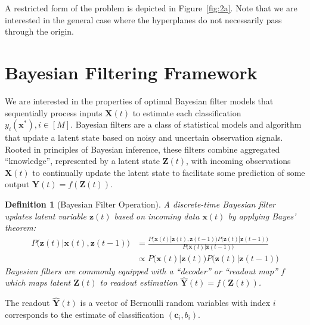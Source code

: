 \documentclass[12pt]{article}
\newtheorem{definition}{Definition}
\begin{document}
A restricted form of the problem is depicted in Figure~\ref{fig:2a}. Note that we are interested in the general case where the hyperplanes do not necessarily pass through the origin. 




\section{Bayesian Filtering Framework}
\label{sec:bayes_framework}

We are interested in the properties of optimal Bayesian filter models that sequentially process inputs $\mathbf X(t)$ to estimate each classification $y_i(\mathbf x^*), i\in [M]$. 
Bayesian filters are a class of statistical models and algorithm that update a latent state based on noisy and uncertain observation signals. 
Rooted in principles of Bayesian inference, these filters combine aggregated ``knowledge'', represented by a latent state $\mathbf Z(t)$, with incoming observations $\mathbf X(t)$ to continually update the latent state to facilitate some prediction of some output $\mathbf Y(t) = f(\mathbf Z(t))$. 


\begin{definition}[Bayesian Filter Operation]
	\label{def:bayesian_filter}
	A discrete-time Bayesian filter updates latent variable $\mathbf z(t)$
	based on incoming data $\mathbf x(t)$ by applying Bayes' theorem: 
	\begin{align}
		\label{eqn:bayes_filter}
		P \big(\mathbf z(t) | \mathbf  x(t), \mathbf z(t-1)\big) &= \frac{
			P\big(\mathbf x(t) | \mathbf z(t), \mathbf z(t-1)\big) 
			P\big(\mathbf z(t) | \mathbf z(t-1)\big)
		}{
			P\big(\mathbf x(t) | \mathbf z(t-1)\big)
		} \\
		&\propto P\big(\mathbf x(t) | \mathbf z(t) \big) 
			P\big(\mathbf z(t) | \mathbf z(t-1)\big)
	\end{align}
	Bayesian filters are commonly equipped with a ``decoder'' or ``readout
	map'' $f$ which maps latent $\mathbf Z(t)$ to readout estimation
	$\hat{\mathbf Y}(t) = f(\mathbf Z(t))$.
\end{definition}


The readout $\hat{\mathbf Y}(t)$ is a vector of Bernoulli random variables with index $i$ corresponds to the estimate of classification $(\mathbf c_i, b_i)$. 
\end{document}
